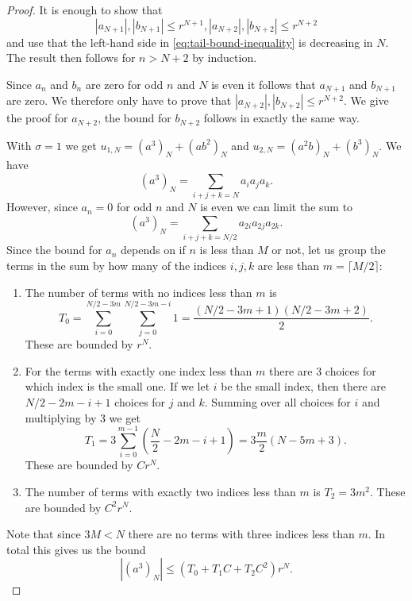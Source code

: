 \documentclass[10pt,a4paper]{amsart}
\begin{document}
\begin{proof}
  It is enough to show that
  \begin{equation*}
    |a_{N + 1}|, |b_{N + 1}| \leq r^{N + 1},
    |a_{N + 2}|, |b_{N + 2}| \leq r^{N + 2}
  \end{equation*}
  and use that the left-hand side in \eqref{eq:tail-bound-inequality}
  is decreasing in \(N\). The result then follows for \(n > N + 2\) by
  induction.

  Since \(a_{n}\) and \(b_{n}\) are zero for odd \(n\) and \(N\) is
  even it follows that \(a_{N + 1}\) and \(b_{N + 1}\) are zero. We
  therefore only have to prove that
  \(|a_{N + 2}|, |b_{N + 2}| \leq r^{N + 2}\). We give the proof for
  \(a_{N + 2}\), the bound for \(b_{N + 2}\) follows in exactly the
  same way.

  With \(\sigma = 1\) we get \(u_{1,N} = (a^{3})_N + (ab^{2})_N\) and
  \(u_{2,N} = (a^{2}b)_N + (b^{3})_N\). We have
  \begin{equation*}
    (a^{3})_{N} = \sum_{i + j + k = N}a_{i}a_{j}a_{k}.
  \end{equation*}
  However, since \(a_{n} = 0\) for odd \(n\) and \(N\) is even we can
  limit the sum to
  \begin{equation*}
    (a^{3})_{N} = \sum_{i + j + k = N/2}a_{2i}a_{2j}a_{2k}.
  \end{equation*}
  Since the bound for \(a_{n}\) depends on if \(n\) is less than \(M\)
  or not, let us group the terms in the sum by how many of the indices
  \(i, j, k\) are less than \(m = \lceil M / 2 \rceil\):
  \begin{enumerate}
  \item The number of terms with no indices less than \(m\) is
    \begin{equation*}
      T_{0} = \sum_{i = 0}^{N/2 - 3m}\sum_{j = 0}^{N/2 - 3m - i} 1 = \frac{(N/2 - 3m + 1)(N/2 - 3m + 2)}{2}.
    \end{equation*}
    These are bounded by \(r^{N}\).
  \item For the terms with exactly one index less than \(m\) there are
    \(3\) choices for which index is the small one. If we let \(i\) be
    the small index, then there are \(N / 2 - 2m - i + 1\) choices for
    \(j\) and \(k\). Summing over all choices for \(i\) and
    multiplying by \(3\) we get
    \begin{equation*}
      T_{1} = 3\sum_{i = 0}^{m - 1} (\frac{N}{2} - 2m - i + 1) = 3\frac{m}{2}\left(N - 5m + 3\right).
    \end{equation*}
    These are bounded by \(Cr^{N}\).
  \item The number of terms with exactly two indices less than \(m\)
    is \(T_{2} = 3m^{2}\). These are bounded by \(C^{2}r^{N}\).
  \end{enumerate}
  Note that since \(3M < N\) there are no terms with three indices
  less than \(m\). In total this gives us the bound
  \begin{equation*}
    |(a^{3})_{N}| \leq (T_{0} + T_{1}C + T_{2}C^{2})r^{N}.
  \end{equation*}


\end{proof}
\end{document}
